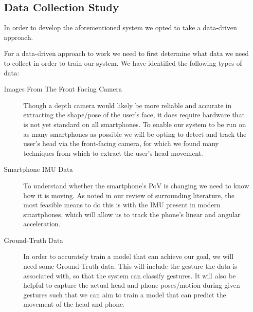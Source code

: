 \subsection{Data Collection Study} %


In order to develop the aforementioned system we opted to take a data-driven approach.

For a data-driven approach to work we need to first determine what data we need to collect in order to train our system. We have identified the following types of data:
\begin{description}
    \item[Images From The Front Facing Camera]\nl 
    Though a depth camera would likely be more reliable and accurate in extracting the shape/pose of the user's face, it does require hardware that is not yet standard on all smartphones. To enable our system to be run on as many smartphones as possible we will be opting to detect and track the user's head via the front-facing camera, for which we found many techniques from which to extract the user's head movement\cite{varona2008hands, lopez2012head, viola2004robust, kim2017real, neto2012real, francone2011using, yan2021fast}.
    \item[Smartphone IMU Data]\nl 
        To understand whether the smartphone's PoV is changing we need to know how it is moving. 
        As noted in our review of surrounding literature, the most feasible means to do this is with the IMU present in modern smartphones\cite{mantyla2000hand, kratz2013combining, neelasagar2015real, garcia2014contextualized}, which will allow us to track the phone's linear and angular acceleration.
    \item[Ground-Truth Data]\nl 
        In order to accurately train a model that can achieve our goal, we will need some Ground-Truth data. This will include the gesture the data is associated with, so that the system can classify gestures. It will also be helpful to capture the actual head and phone poses/motion during given gestures such that we can aim to train a model that can predict the movement of the head and phone.
\end{description}

